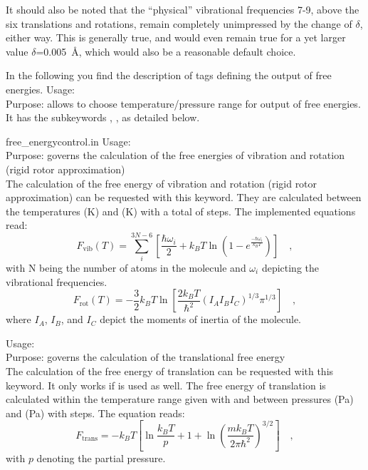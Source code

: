 It should also be noted that the ``physical'' vibrational frequencies
7-9, above the six translations and rotations, remain completely unimpressed
by the change of $\delta$, either way. This is generally true, and
would even remain true for a yet larger value $\delta$=0.005~{\AA},
which would also be a reasonable default choice.


In the following you find the description of tags defining the output of free energies.
{ 
Usage:  \\[1.0em]
  Purpose: allows to choose temperature/pressure range for output of free energies.
  It has the subkeywords ,
  ,
  as detailed below.\\ }

   {free\_energy}{control.in}
  {Usage:    \\[1.0em]
  Purpose: governs the calculation of the free energies of vibration and rotation (rigid rotor approximation)\\}
The calculation of the free energy of vibration and rotation (rigid rotor approximation) can be requested with this keyword. They are calculated between the temperatures  (K) and  (K) with a total of  steps. The implemented equations read: 
\begin{equation}
   F_{\text{vib}}(T) = \sum_i^{3N-6} \left[ \frac{\hbar \omega_i}{2} + k_B T \ln \left(1-e^{\frac{-\hbar\omega_i }{k_B T}} \right)\right] \quad ,
\end{equation}
with N being the number of atoms in the molecule and $\omega_i$ depicting the vibrational frequencies.
\begin{equation}
   F_\text{rot}(T) = -\frac{3}{2} k_B T \ln \left[ \frac{2k_BT}{\hbar^2} (I_A I_B I_C)^{1/3} \pi^{1/3}\right] \quad ,
\end{equation}
where $I_A$, $I_B$, and $I_C$ depict the moments of inertia of the molecule.

  {Usage:    \\[1.0em]
  Purpose: governs the calculation of the translational free energy\\}
The calculation of the free energy of translation can be requested with this keyword. 
It only works if   is used as well.
The free energy of translation is calculated within the temperature range given with
  and between pressures  (Pa) and
 (Pa) with  steps. The equation reads:
\begin{equation}
   F_\text{trans} = -k_B T \left[ \ln \frac{k_B T}{p} + 1 + \ln(\frac{m k_B T}{2\pi \hbar^2})^{3/2}\right] \quad,
\end{equation}
with $p$ denoting the partial pressure.

